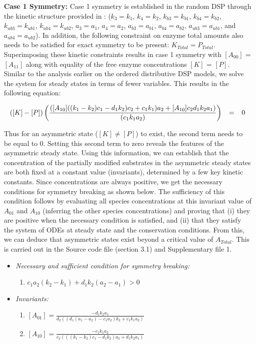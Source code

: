 \documentclass[9pt,lineno]{elife}
\begin{document}
\begin{appendixbox}
\textbf{Case 1 Symmetry:} Case 1 symmetry is established in the random DSP through the kinetic structure provided in : ($k_3 = k_1$, $k_4 = k_2$, $k_{b3} = k_{b1}$, $k_{b4} = k_{b2}$, $k_{ub3} = k_{ub1}$, $k_{ub4} = k_{ub2}$, $a_3 = a_1$, $a_4 = a_2$, $a_{b3} = a_{b1}$, $a_{b4} = a_{b2}$, $a_{ub3} = a_{ub1}$, and $a_{ub4} = a_{ub2}$). In addition, the following constraint on enzyme total amounts also needs to be satisfied for exact symmetry to be present: $K_{Total} = P_{Total}$. Superimposing these kinetic constraints results in case 1 symmetry with $[A_{00}]$ = $[A_{11}]$ along with equality of  the free enzyme concentrations $[K]$ = $[P]$. Similar to the analysis earlier on the ordered distributive DSP models, we solve the system for steady states in terms of fewer variables. This results in the following equation:

\begin{equation}
    \scriptsize{    ([K]-[P])\left(\frac{([A_{10}]((k_1-k_2)c_1-d_1k_2)c_2+c_1k_1)a_2+[A_{10}]c_2d_1k_2a_1)}{(c_1k_1a_2)}\right)} \quad = \quad 0
\end{equation}

Thus for an asymmetric state ($[K] \neq [P]$) to exist, the second term needs to be equal to $0$. Setting this second term to zero reveals the features of the asymmetric steady state. Using this information, we can establish that the concentration of the partially modified substrates in the asymmetric steady states are both fixed at a constant value (invariants), determined by a few key kinetic constants. Since concentrations are always positive, we get the necessary conditions for symmetry breaking as shown below. The sufficiency of this condition follows by evaluating all species concentrations at this invariant value of $A_{01}$ and $A_{10}$  (inferring the other species concentrations) and proving that (i) they are positive when the necessary condition is satisfied, and (ii) that they satisfy the system of ODEs at steady state and the conservation conditions.  From this, we can deduce that asymmetric states exist beyond a critical value of $A_{Total}$. This is carried out in the Source code file (section 3.1) and Supplementary file 1.

\begin{itemize}
    \item \textit{Necessary and sufficient condition for symmetry breaking:}
    \begin{enumerate}
        \item $c_1a_2(k_2-k_1)+d_1k_2(a_2-a_1) > 0$
    \end{enumerate}
    \item \textit{Invariants:} 
    \begin{enumerate}
        \item $[A_{01}] = \frac{-d_1k_2a_1}{d_2((d_1(a_1-a_2)-c_1a_2)k_2+c_1k_1a_2)}$
        \item $[A_{10}] = \frac{-c_1k_1a_2}{c_2(((k_1-k_2)c_1-d_1k_2)a_2+d_1k_2a_1)}$
    \end{enumerate}
\end{itemize}


\end{appendixbox}
\end{document}
